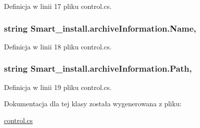 Definicja w linii 17 pliku control.\+cs.

\hypertarget{class_smart__install_1_1archive_information_a30242e937fcc6f3b1290cd3b05a2d6d6}{
\subsubsection[{Name}]{\setlength{\rightskip}{0pt plus 5cm}string Smart\+\_\+install.\+archive\+Information.\+Name\hspace{0.3cm}{\ttfamily [get]}, {\ttfamily [set]}}}\label{class_smart__install_1_1archive_information_a30242e937fcc6f3b1290cd3b05a2d6d6}


Definicja w linii 18 pliku control.\+cs.

\hypertarget{class_smart__install_1_1archive_information_a794efeb3f46e5c0ec5eb101b1c17037d}{
\subsubsection[{Path}]{\setlength{\rightskip}{0pt plus 5cm}string Smart\+\_\+install.\+archive\+Information.\+Path\hspace{0.3cm}{\ttfamily [get]}, {\ttfamily [set]}}}\label{class_smart__install_1_1archive_information_a794efeb3f46e5c0ec5eb101b1c17037d}


Definicja w linii 19 pliku control.\+cs.



Dokumentacja dla tej klasy została wygenerowana z pliku\+:\begin{DoxyCompactItemize}
\item 
\hyperlink{control_8cs}{control.\+cs}\end{DoxyCompactItemize}
